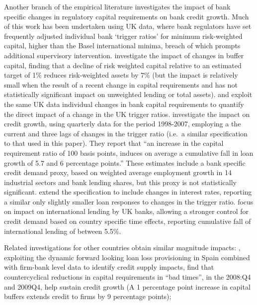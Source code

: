 \documentclass[
  12,
]{article}
\begin{document}
Another branch of the empirical literature investigates the impact of bank specific changes in regulatory capital requirements on bank credit growth. Much of this work has been undertaken using UK data, where bank regulators have set frequently adjusted individual bank `trigger ratios' for minimum risk-weighted capital, higher than the Basel international minima, breach of which prompts additional supervisory intervention. \citet{francis2012capital} investigate the impact of changes in buffer capital, finding that a decline of risk weighted capital relative to an estimated target of 1\% reduces risk-weighted assets by 7\% (but the impact is relatively small when the result of a recent change in capital requirements and has not statistically significant impact on unweighted lending or total assets). \citet{aiyar2014international} and \citet{aiyar2016does} exploit the same UK data individual changes in bank capital requirements to quantify the direct impact of a change in the UK trigger ratios. \citet{aiyar2014international} investigate the impact on credit growth, using quarterly data for the period 1998-2007, employing a the current and three lags of changes in the trigger ratio (i.e.~a similar specification to that used in this paper). They report that ``an increase in the capital requirement ratio of 100 basis points, induces on average a cumulative fall in loan growth of 5.7 and 6 percentage points.'' These estimates include a bank specific credit demand proxy, based on weighted average employment growth in 14 industrial sectors and bank lending shares, but this proxy is not statistically significant. \citet{aiyar2016does} extend the specification to include changes in interest rates, reporting a similar only slightly smaller loan responses to changes in the trigger ratio. \citet{aiyar2016does} focus on impact on international lending by UK banks, allowing a stronger control for credit demand based on country specific time effects, reporting cumulative fall of international lending of between 5.5\%.

Related investigations for other countries obtain similar magnitude impacts: \citet{jimenez2017macroprudential}, exploiting the dynamic forward looking loan loss provisioning in Spain combined with firm-bank level data to identify credit supply impacts, find that countercyclical reductions in capital requirements in ``bad times'', in the 2008:Q4 and 2009Q4, help sustain credit growth (A 1 percentage point increase in capital buffers extends credit to firms by 9 percentage points);
\end{document}
